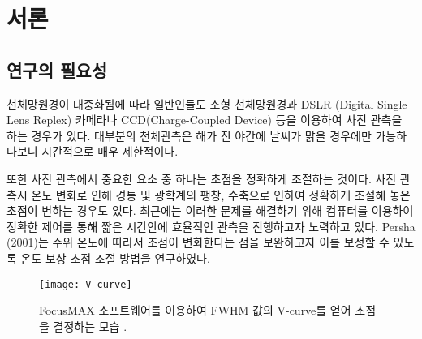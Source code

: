 

\section{서론}
\subsection{연구의 필요성}

천체망원경이 대중화됨에 따라 일반인들도 소형 천체망원경과 DSLR (Digital Single Lens Replex) 카메라나 CCD(Charge-Coupled Device) 등을 이용하여 사진 관측을 하는 경우가 있다. 대부분의 천체관측은 해가 진 야간에 날씨가 맑을 경우에만 가능하다보니 시간적으로 매우 제한적이다. 

또한 사진 관측에서 중요한 요소 중 하나는 초점을 정확하게 조절하는 것이다. 사진 관측시 온도 변화로 인해 경통 및 광학계의 팽창, 수축으로 인하여 정확하게 조절해 놓은 초점이 변하는 경우도 있다. 최근에는 이러한 문제를 해결하기 위해 컴퓨터를 이용하여 정확한 제어를 통해 짧은 시간안에 효율적인 관측을 진행하고자 노력하고 있다. Persha (2001)는 주위 온도에 따라서 초점이 변화한다는 점을 보완하고자 이를 보정할 수 있도록 온도 보상 초점 조절 방법을 연구하였다.\cite{persha2001temperature} 




\begin{figure}[h]
	\begin{center}
		\texttt{[image: V-curve]}
	\end{center}
	\caption{FocusMAX 소프트웨어를 이용하여 FWHM 값의 V-curve를 얻어 초점을 결정하는 모습 \cite{weber2001fast}.}
	\label{V-curve}
\end{figure}

